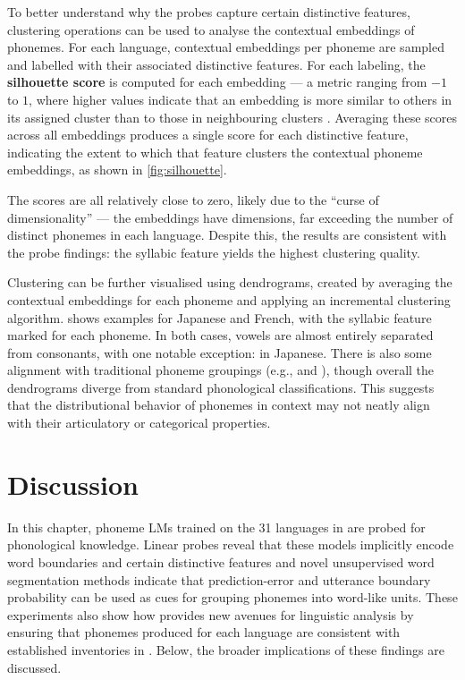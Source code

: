 To better understand why the probes capture certain distinctive features, clustering operations can be used to analyse the contextual embeddings of phonemes. For each language,  contextual embeddings per phoneme are sampled and labelled with their associated distinctive features. For each labeling, the \textbf{silhouette score} is computed for each embedding --- a metric ranging from $-1$ to $1$, where higher values indicate that an embedding is more similar to others in its assigned cluster than to those in neighbouring clusters \citep{rousseeuw1987}. Averaging these scores across all embeddings produces a single score for each distinctive feature, indicating the extent to which that feature clusters the contextual phoneme embeddings, as shown in \cref{fig:silhouette}.

The scores are all relatively close to zero, likely due to the ``curse of dimensionality'' --- the embeddings have  dimensions, far exceeding the number of distinct phonemes in each language. Despite this, the results are consistent with the probe findings: the syllabic feature yields the highest clustering quality.

Clustering can be further visualised using dendrograms, created by averaging the contextual embeddings for each phoneme and applying an incremental clustering algorithm.  shows examples for Japanese and French, with the syllabic feature marked for each phoneme. In both cases, vowels are almost entirely separated from consonants, with one notable exception:  in Japanese. There is also some alignment with traditional phoneme groupings (e.g.,  and ), though overall the dendrograms diverge from standard phonological classifications. This suggests that the distributional behavior of phonemes in context may not neatly align with their articulatory or categorical properties.

\section{Discussion}\label{sec:15-discussion}

In this chapter, phoneme LMs trained on the 31 languages in \ipachildes are probed for phonological knowledge. Linear probes reveal that these models implicitly encode word boundaries and certain distinctive features and novel unsupervised word segmentation methods indicate that prediction-error and utterance boundary probability can be used as cues for grouping phonemes into word-like units. These experiments also show how \gpp provides new avenues for linguistic analysis by ensuring that phonemes produced for each language are consistent with established inventories in \phoible. Below, the broader implications of these findings are discussed.

